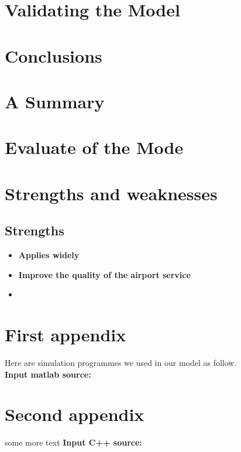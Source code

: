 \documentclass{mcmthesis}
\begin{document}
\section{Validating the Model}


\section{Conclusions}

\section{A Summary}


\section{Evaluate of the Mode}

\section{Strengths and weaknesses}


\subsection{Strengths}
\begin{itemize}
\item \textbf{Applies widely}\\

\item \textbf{Improve the quality of the airport service}\\

\item \textbf{}\\
\end{itemize}


\begin{appendices}

\section{First appendix}


Here are simulation programmes we used in our model as follow.\\

\textbf{\textcolor[rgb]{0.98,0.00,0.00}{Input matlab source:}}


\section{Second appendix}

some more text \textcolor[rgb]{0.98,0.00,0.00}{\textbf{Input C++ source:}}


\end{appendices}

	\nocite{*}



	
\end{document}
